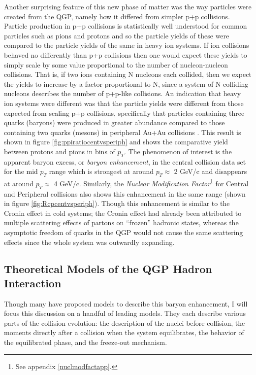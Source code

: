Another surprising feature of this new phase of matter was the way particles were created from the QGP, namely how it differed from simpler p+p collisions. Particle production in p+p collisions is statistically well understood for common particles such as pions and protons and so the particle yields of these were compared to the particle yields of the same in heavy ion systems. If ion collisions behaved no differently than p+p collisions then one would expect these yields to simply scale by some value proportional to the number of nucleon-nucleon collisions. That is, if two ions containing N nucleons each collided, then we expect the yields to increase by a factor proportional to N, since a system of N colliding nucleons describes the number of p+p-like collisions. An indication that heavy ion systems were different was that the particle yields were different from those expected from scaling p+p collisions, specifically that particles containing three quarks (baryons) were produced in greater abundance compared to those containing two quarks (mesons) in peripheral Au+Au collisions \citep{PhysRevLett.97.152301}. This result is shown in figure \ref{fig:ppiratiocentvsperiph} and shows the comparative yield between protons and pions in bins of $p_{T}$. The phenomenon of interest is the apparent baryon excess, or \textit{baryon enhancement}, in the central collision data set for the mid $p_{T}$ range which is strongest at around $p_{T}\approx$ 2 GeV/c and disappears at around $p_{T}\approx$ 4 GeV/c. Similarly, the \textit{Nuclear Modification Factor}\footnote{See appendix \ref{nuclmodfactapp}.} for Central and Peripheral collisions also shows this enhancement in the same range (shown in figure \ref{fig:Rcpcentvsperiph}). Though this enhancement is similar to the Cronin effect in cold systems; the Cronin effect had already been attributed to multiple scattering effects of partons on ``frozen'' hadronic states, whereas the asymptotic freedom of quarks in the QGP would not cause the same scattering effects since the whole system was outwardly expanding.

\subsection{Theoretical Models of the QGP Hadron Interaction}
Though many have proposed models to describe this baryon enhancement, I will focus this discussion on a handful of leading models. They each describe various parts of the collision evolution: the description of the nuclei before collision, the moments directly after a collision when the system equilibrates, the behavior of the equilibrated phase, and the freeze-out mechanism.

